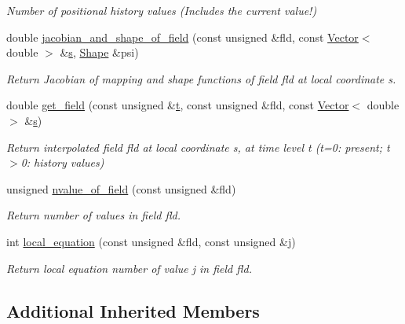 \begin{DoxyCompactItemize}
\begin{DoxyCompactList}\small\item\em Number of positional history values (Includes the current value!) \end{DoxyCompactList}\item 
double \hyperlink{classoomph_1_1ProjectablePVDElementWithContinuousPressure_a9da58f06068f1f3b48e87bb6cbc97018}{jacobian\+\_\+and\+\_\+shape\+\_\+of\+\_\+field} (const unsigned \&fld, const \hyperlink{classoomph_1_1Vector}{Vector}$<$ double $>$ \&\hyperlink{cfortran_8h_ab7123126e4885ef647dd9c6e3807a21c}{s}, \hyperlink{classoomph_1_1Shape}{Shape} \&psi)
\begin{DoxyCompactList}\small\item\em Return Jacobian of mapping and shape functions of field fld at local coordinate s. \end{DoxyCompactList}\item 
double \hyperlink{classoomph_1_1ProjectablePVDElementWithContinuousPressure_a541a3577c83ffd547e6504bebcbda836}{get\+\_\+field} (const unsigned \&\hyperlink{cfortran_8h_af6f0bd3dc13317f895c91323c25c2b8f}{t}, const unsigned \&fld, const \hyperlink{classoomph_1_1Vector}{Vector}$<$ double $>$ \&\hyperlink{cfortran_8h_ab7123126e4885ef647dd9c6e3807a21c}{s})
\begin{DoxyCompactList}\small\item\em Return interpolated field fld at local coordinate s, at time level t (t=0\+: present; t$>$0\+: history values) \end{DoxyCompactList}\item 
unsigned \hyperlink{classoomph_1_1ProjectablePVDElementWithContinuousPressure_a2705856446a53ee4e3944ae8b5006391}{nvalue\+\_\+of\+\_\+field} (const unsigned \&fld)
\begin{DoxyCompactList}\small\item\em Return number of values in field fld. \end{DoxyCompactList}\item 
int \hyperlink{classoomph_1_1ProjectablePVDElementWithContinuousPressure_a90cc8c352dc5c6dfca3bd26f642c998f}{local\+\_\+equation} (const unsigned \&fld, const unsigned \&j)
\begin{DoxyCompactList}\small\item\em Return local equation number of value j in field fld. \end{DoxyCompactList}\end{DoxyCompactItemize}
\subsection*{Additional Inherited Members}


